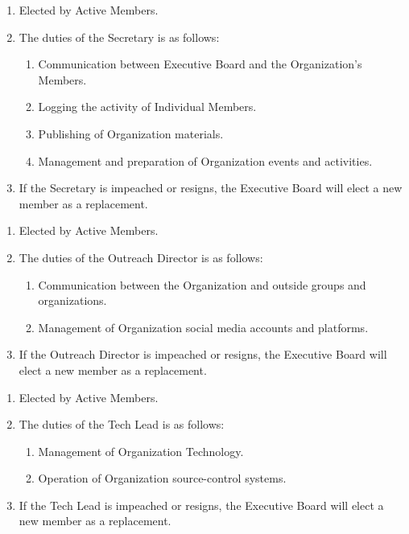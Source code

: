 \begin{enumerate}
	\item Elected by Active Members.

	\item The duties of the Secretary is as follows:
		\begin{enumerate}
			\item Communication between Executive Board and the Organization's Members.

			\item Logging the activity of Individual Members.

			\item Publishing of Organization materials.

			\item Management and preparation of Organization events and activities.
		\end{enumerate}

	\item If the Secretary is impeached or resigns, the Executive Board will elect
		a new member as a replacement.
\end{enumerate}

\begin{enumerate}
	\item Elected by Active Members.

	\item The duties of the Outreach Director is as follows:
		\begin{enumerate}
			\item Communication between the Organization and outside groups and organizations.

			\item Management of Organization social media accounts and platforms.
		\end{enumerate}

	\item If the Outreach Director is impeached or resigns, the Executive Board
		will elect a new member as a replacement.
\end{enumerate}

\begin{enumerate}
	\item Elected by Active Members.

	\item The duties of the Tech Lead is as follows:
		\begin{enumerate}
			\item Management of Organization Technology.

			\item Operation of Organization source-control systems.
		\end{enumerate}

	\item If the Tech Lead is impeached or resigns, the Executive Board will elect
		a new member as a replacement.
\end{enumerate}
